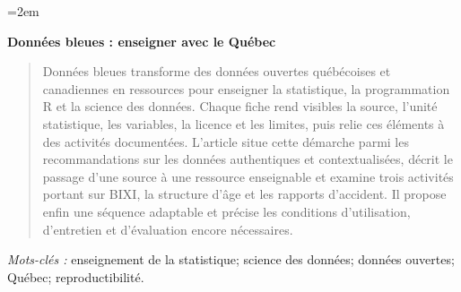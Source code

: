 \documentclass[10pt]{article}
\begin{document}
\renewcommand{\tablename}{\textsc{Tableau}}
\emergencystretch=2em

\begin{center}
\textsf{\LARGE \textbf{Données bleues : enseigner avec le Québec}}
\end{center}

\baselineskip

\begin{abstract}
Données bleues transforme des données ouvertes québécoises et canadiennes en ressources pour enseigner la statistique, la programmation R et la science des données. Chaque fiche rend visibles la source, l'unité statistique, les variables, la licence et les limites, puis relie ces éléments à des activités documentées. L'article situe cette démarche parmi les recommandations sur les données authentiques et contextualisées, décrit le passage d'une source à une ressource enseignable et examine trois activités portant sur BIXI, la structure d'âge et les rapports d'accident. Il propose enfin une séquence adaptable et précise les conditions d'utilisation, d'entretien et d'évaluation encore nécessaires.
\end{abstract}

\noindent\textit{Mots-clés :} enseignement de la statistique; science des données; données ouvertes; Québec; reproductibilité.


\end{document}
